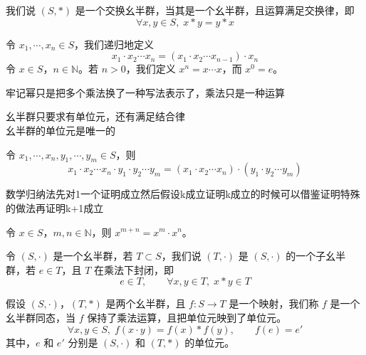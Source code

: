 \begin{definition}[交换幺半群（定义 1.2）]
我们说 $(S,*)$ 是一个交换幺半群，当其是一个幺半群，且运算满足交换律，即
\[
\forall x,y\in S,\;x*y=y*x
\]
\end{definition}

\begin{definition}[幂（定义 1.3）]
令 $x_1,\cdots,x_n\in S$，我们递归地定义
\[
x_1\cdot x_2\cdots x_n=(x_1\cdot x_2\cdots x_{n-1})\cdot x_n
\]
令 $x\in S$，$n\in\mathbb{N}$。若 $n>0$，我们定义 $x^n=x\cdots x$，而 $x^0=e$。
\end{definition}

\begin{note}[定义1 3群中的幂]
牢记幂只是把多个乘法换了一种写法表示了，乘法只是一种运算
\end{note}

\begin{note}[幺半群的定义 定义1 2 定义1 3]
幺半群只要求有单位元，还有满足结合律 \\
幺半群的单位元是唯一的
\end{note}

\begin{proposition}[广义结合律（命题 1.2）]
令 $x_1,\cdots,x_n,y_1,\cdots,y_m\in S$，则
\[
x_1\cdot x_2\cdots x_n\cdot y_1\cdot y_2\cdots y_m=(x_1\cdot x_2\cdots x_n)\cdot(y_1\cdot y_2\cdots y_m)
\]
\end{proposition}

\begin{note}[广义结合律与数学归纳法]
数学归纳法先对1一个证明成立然后假设k成立证明k成立的时候可以借鉴证明特殊的做法再证明k+1成立
\end{note}

\begin{proposition}[命题 1.3]
令 $x\in S$，$m,n\in\mathbb{N}$，则 $x^{m+n}=x^m\cdot x^n$。
\end{proposition}

\begin{definition}[子幺半群（定义 1.4）]
令 $(S,\cdot)$ 是一个幺半群，若 $T\subset S$，我们说 $(T,\cdot)$ 是 $(S,\cdot)$ 的一个子幺半群，若 $e\in T$，且 $T$ 在乘法下封闭，即
\[
e\in T,\qquad\forall x,y\in T,\;x*y\in T
\]
\end{definition}

\begin{definition}[幺半群同态（定义 1.5）]
假设 $(S,\cdot)$，$(T,*)$ 是两个幺半群，且 $f:S\to T$ 是一个映射，我们称 $f$ 是一个幺半群同态，当 $f$ 保持了乘法运算，且把单位元映到了单位元。
\[
\forall x,y\in S,\;f(x\cdot y)=f(x)*f(y),\qquad f(e)=e'
\]
其中，$e$ 和 $e'$ 分别是 $(S,\cdot)$ 和 $(T,*)$ 的单位元。
\end{definition}

